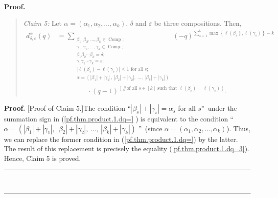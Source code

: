 \documentclass[numbers=enddot,12pt,final,onecolumn,notitlepage]{scrartcl}%
\theoremstyle{definition}
\newenvironment{statement}{\begin{quote}}{\end{quote}}
\newenvironment{proof}[1][Proof]{\noindent\textbf{#1.} }{\ \rule{0.5em}{0.5em}}
\let\sumnonlimits\sum
\renewcommand{\sum}{\sumnonlimits\limits}
\begin{document}
\begin{proof}
\begin{statement}
\textit{Claim 5:} Let $\alpha=\left(  \alpha_{1},\alpha_{2},\ldots,\alpha
_{k}\right)  $, $\delta$ and $\varepsilon$ be three compositions. Then,%
\begin{align}
d_{\delta,\varepsilon}^{\alpha}\left(  q\right)   &  =\sum_{\substack{\beta
_{1},\beta_{2},\ldots,\beta_{k}\in\operatorname*{Comp};\\\gamma_{1},\gamma
_{2},\ldots,\gamma_{k}\in\operatorname*{Comp};\\\beta_{1}\beta_{2}\cdots
\beta_{k}=\delta;\\\gamma_{1}\gamma_{2}\cdots\gamma_{k}=\varepsilon
;\\\left\vert \ell\left(  \beta_{s}\right)  -\ell\left(  \gamma_{s}\right)
\right\vert \leq1\text{ for all }s;\\\alpha=\left(  \left\vert \beta
_{1}\right\vert +\left\vert \gamma_{1}\right\vert ,\ \left\vert \beta
_{2}\right\vert +\left\vert \gamma_{2}\right\vert ,\ \ldots,\ \left\vert
\beta_{k}\right\vert +\left\vert \gamma_{k}\right\vert \right)  }}\left(
-q\right)  ^{\sum_{s=1}^{k}\max\left\{  \ell\left(  \beta_{s}\right)
,\ell\left(  \gamma_{s}\right)  \right\}  -k}\nonumber\\
&  \ \ \ \ \ \ \ \ \ \ \ \ \ \ \ \ \ \ \ \ \cdot\left(  q-1\right)  ^{\left(
\text{\# of all }s\in\left[  k\right]  \text{ such that }\ell\left(  \beta
_{s}\right)  =\ell\left(  \gamma_{s}\right)  \right)  }.
\label{pf.thm.product.1.dq=3}%
\end{align}

\end{statement}

\begin{proof}
[Proof of Claim 5.]The condition \textquotedblleft$\left\vert \beta
_{s}\right\vert +\left\vert \gamma_{s}\right\vert =\alpha_{s}$ for all
$s$\textquotedblright\ under the summation sign in (\ref{pf.thm.product.1.dq=}%
) is equivalent to the condition \textquotedblleft$\alpha=\left(  \left\vert
\beta_{1}\right\vert +\left\vert \gamma_{1}\right\vert ,\ \left\vert \beta
_{2}\right\vert +\left\vert \gamma_{2}\right\vert ,\ \ldots,\ \left\vert
\beta_{k}\right\vert +\left\vert \gamma_{k}\right\vert \right)  $%
\textquotedblright\ (since $\alpha=\left(  \alpha_{1},\alpha_{2},\ldots
,\alpha_{k}\right)  $). Thus, we can replace the former condition in
(\ref{pf.thm.product.1.dq=}) by the latter. The result of this replacement is
precisely the equality (\ref{pf.thm.product.1.dq=3}). Hence, Claim 5 is proved.
\end{proof}


\end{proof}
\end{document}
